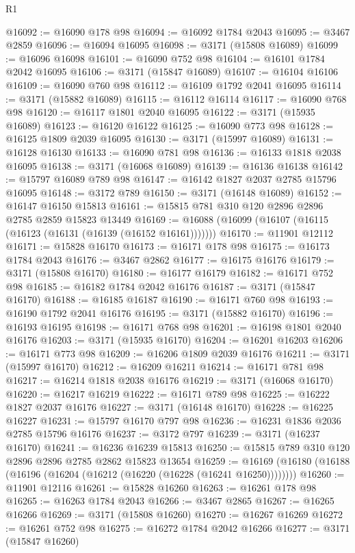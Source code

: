 \begin{lexlean}{R1}
\begin{coremodule}
@16092 := @16090 @178 @98
@16094 := @16092 @1784 @2043
@16095 := @3467 @2859
@16096 := @16094 @16095
@16098 := @3171 (@15808 @16089)
@16099 := @16096 @16098
@16101 := @16090 @752 @98
@16104 := @16101 @1784 @2042 @16095
@16106 := @3171 (@15847 @16089)
@16107 := @16104 @16106
@16109 := @16090 @760 @98
@16112 := @16109 @1792 @2041 @16095
@16114 := @3171 (@15882 @16089)
@16115 := @16112 @16114
@16117 := @16090 @768 @98
@16120 := @16117 @1801 @2040 @16095
@16122 := @3171 (@15935 @16089)
@16123 := @16120 @16122
@16125 := @16090 @773 @98
@16128 := @16125 @1809 @2039 @16095
@16130 := @3171 (@15997 @16089)
@16131 := @16128 @16130
@16133 := @16090 @781 @98
@16136 := @16133 @1818 @2038 @16095
@16138 := @3171 (@16068 @16089)
@16139 := @16136 @16138
@16142 := @15797 @16089 @789 @98
@16147 := @16142 @1827 @2037 @2785 @15796 @16095
@16148 := @3172 @789
@16150 := @3171 (@16148 @16089)
@16152 := @16147 @16150 @15813
@16161 := @15815 @781 @310 @120 @2896 @2896 @2785 @2859 @15823 @13449
@16169 := @16088 (@16099 (@16107 (@16115 (@16123 (@16131 (@16139 (@16152 @16161)))))))
@16170 := @11901 @12112
@16171 := @15828 @16170
@16173 := @16171 @178 @98
@16175 := @16173 @1784 @2043
@16176 := @3467 @2862
@16177 := @16175 @16176
@16179 := @3171 (@15808 @16170)
@16180 := @16177 @16179
@16182 := @16171 @752 @98
@16185 := @16182 @1784 @2042 @16176
@16187 := @3171 (@15847 @16170)
@16188 := @16185 @16187
@16190 := @16171 @760 @98
@16193 := @16190 @1792 @2041 @16176
@16195 := @3171 (@15882 @16170)
@16196 := @16193 @16195
@16198 := @16171 @768 @98
@16201 := @16198 @1801 @2040 @16176
@16203 := @3171 (@15935 @16170)
@16204 := @16201 @16203
@16206 := @16171 @773 @98
@16209 := @16206 @1809 @2039 @16176
@16211 := @3171 (@15997 @16170)
@16212 := @16209 @16211
@16214 := @16171 @781 @98
@16217 := @16214 @1818 @2038 @16176
@16219 := @3171 (@16068 @16170)
@16220 := @16217 @16219
@16222 := @16171 @789 @98
@16225 := @16222 @1827 @2037 @16176
@16227 := @3171 (@16148 @16170)
@16228 := @16225 @16227
@16231 := @15797 @16170 @797 @98
@16236 := @16231 @1836 @2036 @2785 @15796 @16176
@16237 := @3172 @797
@16239 := @3171 (@16237 @16170)
@16241 := @16236 @16239 @15813
@16250 := @15815 @789 @310 @120 @2896 @2896 @2785 @2862 @15823 @13654
@16259 := @16169 (@16180 (@16188 (@16196 (@16204 (@16212 (@16220 (@16228 (@16241 @16250))))))))
@16260 := @11901 @12116
@16261 := @15828 @16260
@16263 := @16261 @178 @98
@16265 := @16263 @1784 @2043
@16266 := @3467 @2865
@16267 := @16265 @16266
@16269 := @3171 (@15808 @16260)
@16270 := @16267 @16269
@16272 := @16261 @752 @98
@16275 := @16272 @1784 @2042 @16266
@16277 := @3171 (@15847 @16260)

\end{coremodule}
\end{lexlean}
